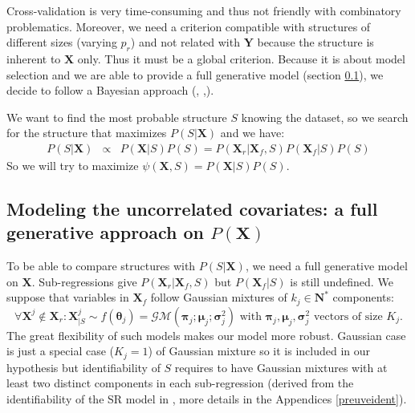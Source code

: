 \documentclass[11pt,a4paper]{article}
\begin{document}
Cross-validation is very time-consuming and thus not friendly with combinatory problematics. Moreover, we need a criterion compatible with structures of different sizes (varying $p_r$) and not related with $\boldsymbol{Y}$ because the structure is inherent to $\boldsymbol{X}$ only. Thus it must be a global criterion. 	
Because it is about model selection and we are able to provide a full generative model (section \ref{sectionfullgen}), we decide to follow a Bayesian approach (\cite{raftery1995bayesian}, \cite{andrieu1999joint},\cite{chipman2001practical}).  
	
We want to find the most probable structure $S$ knowing the dataset, so we search for the structure that maximizes $P(S|\boldsymbol{X})$ and we have:	
	\begin{eqnarray}
	 \label{approxBIC} P(S|\boldsymbol{X})&\propto & P(\boldsymbol{X}|S)P(S)
	=P(\boldsymbol{X}_r|\boldsymbol{X}_f,S)P(\boldsymbol{X}_f|S)P(S)
	\end{eqnarray}
So we will try to maximize $\psi(\boldsymbol{X},S)=P(\boldsymbol{X}|S)P(S)$.
	

	\subsection{Modeling the uncorrelated covariates: a full generative approach on $P(\boldsymbol{X})$} \label{sectionfullgen}
	To be able to compare structures with $P(S|\boldsymbol{X})$, we need a full generative model on $\boldsymbol{X}$. Sub-regressions give $P(\boldsymbol{X}_r|\boldsymbol{X}_f,S) $ but $P(\boldsymbol{X}_f|S)$ is still undefined. We suppose that variables in $\boldsymbol{X}_f$ follow Gaussian mixtures of $k_j \in \mathbf{N}^*$ components: 
	\begin{equation}
			\forall \boldsymbol{X}^j \notin \boldsymbol{X}_r : \boldsymbol{X}^j_{|S} \sim f(\boldsymbol{\theta}_j)=\mathcal{GM}(\boldsymbol{\pi}_j;\boldsymbol{\mu}_j;\boldsymbol{\sigma}^2_j) \textrm{ with } \boldsymbol{\pi}_j,\boldsymbol{\mu}_j,\boldsymbol{\sigma}^2_j \textrm{ vectors of size } K_j. \label{mixtureX1}
		\end{equation}
		The great flexibility \cite{mclachlan2004finite} of such models makes our model more robust. Gaussian case is just a special case ($K_j=1$) of Gaussian mixture so it is included in our hypothesis but identifiability of $S$ requires to have Gaussian mixtures with at least two distinct components in each sub-regression (derived from the identifiability of the SR model in \cite{maugis2009variable}, more details in the Appendices \ref{preuveident}).
				
\end{document}
